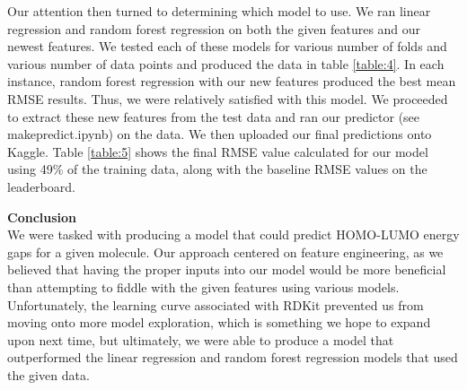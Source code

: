 \documentclass[12pt]{article}
\begin{document}
Our attention then turned to determining which model to use. We ran linear regression and random forest regression on both the given features and our newest features. We tested each of these models for various number of folds and various number of data points and produced the data in table \ref{table:4}. In each instance, random forest regression with our new features produced the best mean RMSE results. Thus, we were relatively satisfied with this model. We proceeded to extract these new features from the test data and ran our predictor (see makepredict.ipynb) on the data. We then uploaded our final predictions onto Kaggle. Table \ref{table:5} shows the final RMSE value calculated for our model using 49\% of the training data, along with the baseline RMSE values on the leaderboard. \\

\bigskip

\textbf{Conclusion} \\
We were tasked with producing a model that could predict HOMO-LUMO energy gaps for a given molecule. Our approach centered on feature engineering, as we believed that having the proper inputs into our model would be more beneficial than attempting to fiddle with the given features using various models. Unfortunately, the learning curve associated with RDKit prevented us from moving onto more model exploration, which is something we hope to expand upon next time, but ultimately, we were able to produce a model that outperformed the linear regression and random forest regression models that used the given data. 
\end{document}
